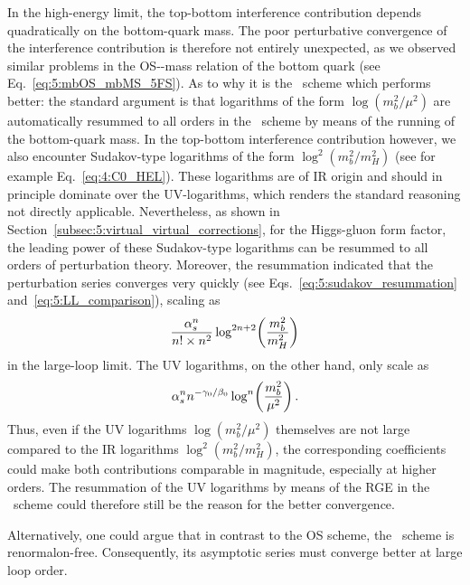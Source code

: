 In the high-energy limit, the top-bottom interference contribution depends quadratically on the bottom-quark mass. The poor perturbative convergence of the interference contribution is therefore not entirely unexpected, as we observed similar problems in the \acs{OS}-\MS-mass relation of the bottom quark (see Eq.~\eqref{eq:5:mbOS_mbMS_5FS}).
As to why it is the \MS\ scheme which performs better: the standard argument is that logarithms of the form $\log\! \left(m_b^2/\mu^2\right)$ are automatically resummed to all orders in the \MS\ scheme by means of the running of the bottom-quark mass. In the top-bottom interference contribution however, we also encounter Sudakov-type logarithms of the form $\log^2\! \left(m_b^2/m_H^2 \right)$ (see for example Eq.~\eqref{eq:4:C0_HEL}). These logarithms are of \acs{IR} origin and should in principle dominate over the \acs{UV}-logarithms, which renders the standard reasoning not directly applicable. Nevertheless, as shown in Section~\ref{subsec:5:virtual_virtual_corrections}, for the Higgs-gluon form factor, the leading power of these Sudakov-type logarithms can be resummed to all orders of perturbation theory. Moreover, the resummation indicated that the perturbation series converges very quickly (see Eqs.~\eqref{eq:5:sudakov_resummation} and\ \eqref{eq:5:LL_comparison}), scaling as
\begin{equation}
\frac{\alpha_s^n}{n! \times n^2} \log^{2n + 2}\!\left(\frac{m_b^2}{m_H^2} \right)
\end{equation}
in the large-loop limit. The \acs{UV} logarithms, on the other hand, only scale as
\begin{equation}
\alpha_s^n n^{-\gamma_0/\beta_0} \log^n\!\left(\frac{m_b^2}{\mu^2} \right).
\end{equation}
Thus, even if the \acs{UV} logarithms $\log\! \left(m_b^2/\mu^2\right)$ themselves are not large compared to the \acs{IR} logarithms $\log^2\! \left(m_b^2/m_H^2 \right)$, the corresponding coefficients could make both contributions comparable in magnitude, especially at higher orders. The resummation of the \acs{UV} logarithms by means of the \acs{RGE} in the \MS\ scheme could therefore still be the reason for the better convergence.

Alternatively, one could argue that in contrast to the \acs{OS} scheme, the \MS\ scheme is renormalon-free. Consequently, its asymptotic series must converge better at large loop order.

